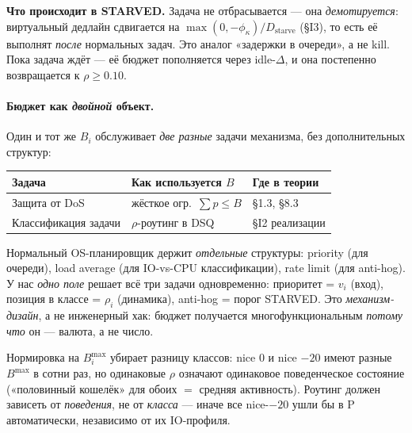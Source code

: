\documentclass[11pt,a4paper]{article}
\begin{document}
\textbf{Что происходит в STARVED.}
Задача не отбрасывается — она \emph{демотируется}: виртуальный
дедлайн сдвигается на $\max(0,-\phi_\kappa)/D_{\text{starve}}$
(§I3), то есть её выполнят \emph{после} нормальных задач. Это
аналог «задержки в очереди», а не kill. Пока задача ждёт — её
бюджет пополняется через idle-$\Delta$, и она постепенно
возвращается к $\rho\geq 0.10$.

\paragraph{Бюджет как \emph{двойной} объект.}
Один и тот же $B_i$ обслуживает \emph{две разные} задачи механизма,
без дополнительных структур:

\begin{center}\small
\begin{tabular}{@{}lll@{}}
\toprule
Задача & Как используется $B$ & Где в теории\\
\midrule
Защита от DoS        & жёсткое огр.\ $\sum p \leq B$   & §1.3, §8.3\\
Классификация задачи & $\rho$-роутинг в DSQ           & §I2 реализации\\
\bottomrule
\end{tabular}
\end{center}

\begin{why}
Нормальный OS-планировщик держит \emph{отдельные} структуры:
priority (для очереди), load average (для IO-vs-CPU классификации),
rate limit (для anti-hog). У нас \emph{одно поле} решает всё три
задачи одновременно: приоритет = $v_i$ (вход), позиция в классе
= $\rho_i$ (динамика), anti-hog = порог STARVED. Это
\emph{механизм-дизайн}, а не инженерный хак: бюджет получается
многофункциональным \emph{потому что} он — валюта, а не число.
\end{why}

\begin{why}
Нормировка на $B_i^{\max}$ убирает разницу классов: nice 0 и
nice $-20$ имеют разные $B^{\max}$ в сотни раз, но одинаковые
$\rho$ означают одинаковое поведенческое состояние
(«половинный кошелёк» для обоих $=$ средняя активность).
Роутинг должен зависеть от \emph{поведения}, не от \emph{класса}
— иначе все nice-$-20$ ушли бы в P автоматически, независимо
от их IO-профиля.
\end{why}
\end{document}
